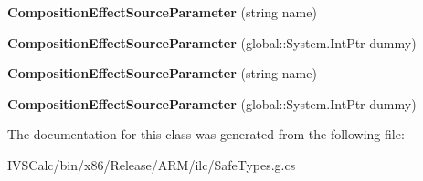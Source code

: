 \begin{DoxyCompactItemize}
{\bfseries Composition\+Effect\+Source\+Parameter} (string name)
\item 
\mbox{\label{class_windows_1_1_u_i_1_1_composition_1_1_composition_effect_source_parameter_a2b5d3181eaf1808e350bba6c20b57b8f}} 
{\bfseries Composition\+Effect\+Source\+Parameter} (global\+::\+System.\+Int\+Ptr dummy)
\item 
\mbox{\label{class_windows_1_1_u_i_1_1_composition_1_1_composition_effect_source_parameter_a1a13689891976e0711a77cf4fa680990}} 
{\bfseries Composition\+Effect\+Source\+Parameter} (string name)
\item 
\mbox{\label{class_windows_1_1_u_i_1_1_composition_1_1_composition_effect_source_parameter_a2b5d3181eaf1808e350bba6c20b57b8f}} 
{\bfseries Composition\+Effect\+Source\+Parameter} (global\+::\+System.\+Int\+Ptr dummy)
\end{DoxyCompactItemize}


The documentation for this class was generated from the following file\+:\begin{DoxyCompactItemize}
\item 
I\+V\+S\+Calc/bin/x86/\+Release/\+A\+R\+M/ilc/Safe\+Types.\+g.\+cs\end{DoxyCompactItemize}
